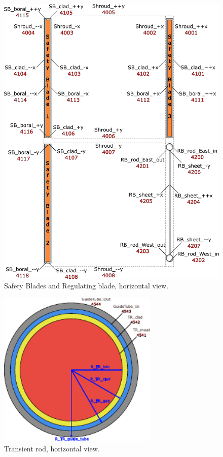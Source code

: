\documentclass{UWNR_modeling}
\begin{document}
\begin{figure}[H]
  \centering
  \includegraphics[width=7in]{SBRB_xy.pdf}
  \caption{Safety Blades and Regulating blade, horizontal view.}
  \label{fig:SBRB_xy}
\end{figure}
\begin{figure}[H]
  \centering
  \includegraphics[width=3in]{TR_xy.pdf}
  \caption{Transient rod, horizontal view.}
  \label{fig:TR_xy}
\end{figure}
\end{document}
